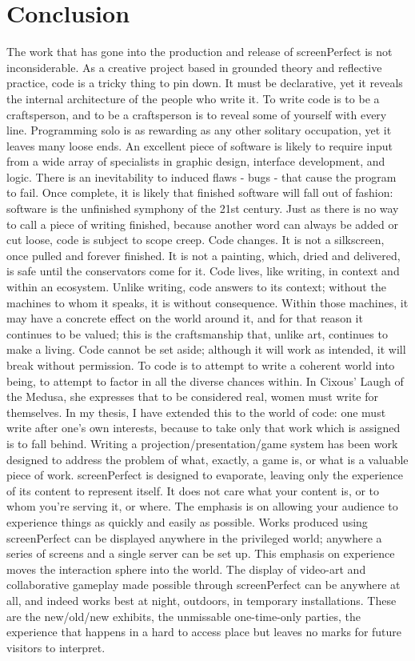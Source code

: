 \section{Conclusion}
The work that has gone into the production and release of screenPerfect is not inconsiderable. As a creative project based in grounded theory and reflective practice, code is a tricky thing to pin down. It must be declarative, yet it reveals the internal architecture of the people who write it. To write code is to be a craftsperson, and to be a craftsperson is to reveal some of yourself with every line.
Programming solo is as rewarding as any other solitary occupation, yet it leaves many loose ends. An excellent piece of software is likely to require input from a wide array of specialists in graphic design, interface development, and logic. There is an inevitability to induced flaws - bugs - that cause the program to fail. Once complete, it is likely that finished software will fall out of fashion: software is the unfinished symphony of the 21st century. Just as there is no way to call a piece of writing finished, because another word can always be added or cut loose, code is subject to scope creep. Code changes. It is not a silkscreen, once pulled and forever finished. It is not a painting, which, dried and delivered, is safe until the conservators come for it. Code lives, like writing, in context and within an ecosystem.
Unlike writing, code answers to its context; without the machines to whom it speaks, it is without consequence. Within those machines, it may have a concrete effect on the world around it, and for that reason it continues to be valued; this is the craftsmanship that, unlike art, continues to make a living. Code cannot be set aside; although it will work as intended, it will break without permission. To code is to attempt to write a coherent world into being, to attempt to factor in all the diverse chances within.
In Cixous’ Laugh of the Medusa\cite{medusa}, she expresses that to be considered real, women must write for themselves. In my thesis, I have extended this to the world of code: one must write after one’s own interests, because to take only that work which is assigned is to fall behind. Writing a projection/presentation/game system has been work designed to address the problem of what, exactly, a game is, or what is a valuable piece of work. screenPerfect is designed to evaporate, leaving only the experience of its content to represent itself. It does not care what your content is, or to whom you’re serving it, or where. The emphasis is on allowing your audience to experience things as quickly and easily as possible.
Works produced using screenPerfect can be displayed anywhere in the privileged world; anywhere a series of screens and a single server can be set up. This emphasis on experience moves the interaction sphere into the world. The display of video-art and collaborative gameplay made possible through screenPerfect can be anywhere at all, and indeed works best at night, outdoors, in temporary installations. These are the new/old/new exhibits, the unmissable one-time-only parties, the experience that happens in a hard to access place but leaves no marks for future visitors to interpret.

